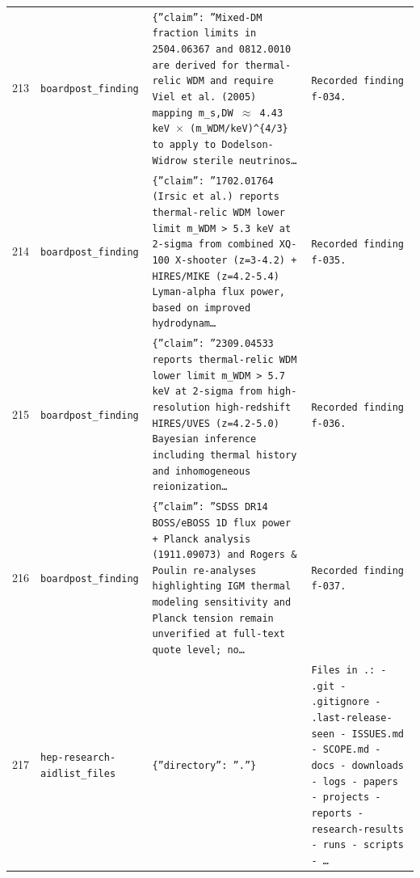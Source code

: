 \documentclass[11pt,a4paper]{article}
\begin{document}
\begin{longtable}{@{}p{}p{}p{}p{}@{}}
213 & \texttt{board}\newline\texttt{post\_\allowbreak{}finding} & \texttt{\{''claim'':\allowbreak{} ''Mixed-DM fraction limits in 2504.06367 and 0812.0010 are derived for thermal-relic WDM and require Viel et al. (2005)\allowbreak{} mapping m\_\allowbreak{}s,\allowbreak{}DW $\approx$ 4.43 keV $\times$ (m\_\allowbreak{}WDM/\allowbreak{}keV)\allowbreak{}\textasciicircum{}\allowbreak{}\{4/\allowbreak{}3\}\allowbreak{} to apply to Dodelson-Widrow sterile neutrinos\ldots{}\allowbreak{}} & \texttt{Recorded finding f-034.} \\
214 & \texttt{board}\newline\texttt{post\_\allowbreak{}finding} & \texttt{\{''claim'':\allowbreak{} ''1702.01764 (Irsic et al.)\allowbreak{} reports thermal-relic WDM lower limit m\_\allowbreak{}WDM \textgreater{}\allowbreak{} 5.3 keV at 2-sigma from combined XQ-100 X-shooter (z=\allowbreak{}3-4.2)\allowbreak{} + HIRES/\allowbreak{}MIKE (z=\allowbreak{}4.2-5.4)\allowbreak{} Lyman-alpha flux power,\allowbreak{} based on improved hydrodynam\ldots{}\allowbreak{}} & \texttt{Recorded finding f-035.} \\
215 & \texttt{board}\newline\texttt{post\_\allowbreak{}finding} & \texttt{\{''claim'':\allowbreak{} ''2309.04533 reports thermal-relic WDM lower limit m\_\allowbreak{}WDM \textgreater{}\allowbreak{} 5.7 keV at 2-sigma from high-resolution high-redshift HIRES/\allowbreak{}UVES (z=\allowbreak{}4.2-5.0)\allowbreak{} Bayesian inference including thermal history and inhomogeneous reionization\ldots{}\allowbreak{}} & \texttt{Recorded finding f-036.} \\
216 & \texttt{board}\newline\texttt{post\_\allowbreak{}finding} & \texttt{\{''claim'':\allowbreak{} ''SDSS DR14 BOSS/\allowbreak{}eBOSS 1D flux power + Planck analysis (1911.09073)\allowbreak{} and Rogers \& Poulin re-analyses highlighting IGM thermal modeling sensitivity and Planck tension remain unverified at full-text quote level;\allowbreak{} no\ldots{}\allowbreak{}} & \texttt{Recorded finding f-037.} \\
217 & \texttt{hep-research-aid}\newline\texttt{list\_\allowbreak{}files} & \texttt{\{''directory'':\allowbreak{} ''.''\}\allowbreak{}} & \texttt{Files in .:\allowbreak{}   - .git   - .gitignore   - .last-release-seen   - ISSUES.md   - SCOPE.md   - docs   - downloads   - logs   - papers   - projects   - reports   - research-results   - runs   - scripts   - \ldots{}\allowbreak{}} \\

\end{longtable}
\end{document}
